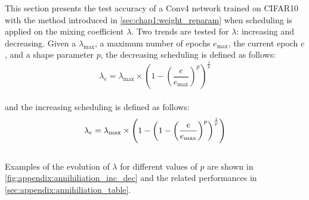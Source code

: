 This section presents the test accuracy of a Conv4 network trained on CIFAR10
with the method introduced in \cref{sec:chap1:weight_reparam} when scheduling is
applied on the mixing coefficient $\lambda$. Two trends are tested for
$\lambda$: increasing and decreasing. Given a $\lambda_\text{max}$, a maximum
number of epochs $e_\text{max}$, the current epoch $e$, and a shape parameter
$p$, the decreasing scheduling is defined as follows:\\
$$
    \lambda_e = \lambda_\text{max} \times \left(1 - \left(\frac{e}{e_\text{max}}\right)^p\right)^\frac{1}{p}
$$\\
and the increasing scheduling is defined as follows:\\
$$\\
    \lambda_e = \lambda_\text{max} \times \left( 1- \left(1 - \left(\frac{e}{e_\text{max}}\right)^p\right)^\frac{1}{p} \right)
$$\\
Examples of the evolution of $\lambda$ for different values of $p$ are shown in
\cref{fig:appendix:annihiliation_inc_dec} and the related performances in
\cref{sec:appendix:annihiliation_table}.\\


